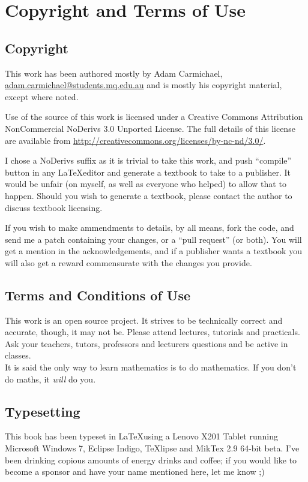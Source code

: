 \chapter{Copyright and Terms of Use}
\label{chap:copyright}
\section{Copyright}
This work has been authored mostly by Adam Carmichael,
\url{adam.carmichael@students.mq.edu.au} and is mostly his copyright material,
except where noted.

Use of the source of this work is licensed under a Creative Commons
Attribution NonCommercial NoDerivs 3.0 Unported License. The full details of
this license are available from
\url{http://creativecommons.org/licenses/by-nc-nd/3.0/}.

I chose a NoDerivs suffix as it is trivial to take this work, and push
``compile'' button in any \LaTeX editor and generate a textbook to take to a
publisher. It would be unfair (on myself, as well as everyone who helped) to
allow that to happen. Should you wish to generate a textbook, please contact the
author to discuss textbook licensing.

If you wish to make ammendments to details, by all means, fork the code, and
send me a patch containing your changes, or a ``pull request'' (or both). You
will get a mention in the acknowledgements, and if a publisher wants a textbook
you will also get a reward commensurate with the changes you provide.

\section{Terms and Conditions of Use}
This work is an open source project. It strives to be technically correct and
accurate, though, it may not be. Please attend lectures, tutorials and
practicals. Ask your teachers, tutors, professors and lecturers questions and be
active in classes.
\\
It is said the only way to learn mathematics is to do mathematics. If you don't
do maths, it \emph{will} do you.

\section{Typesetting}
This book has been typeset in \LaTeX using a Lenovo X201 Tablet running
Microsoft Windows 7, Eclipse Indigo, TeXlipse and MikTex 2.9 64-bit beta. I've
been drinking copious amounts of energy drinks and coffee; if you would like to
become a sponsor and have your name mentioned here, let me know ;)

